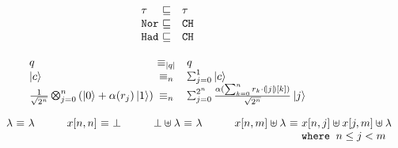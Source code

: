 \begin{figure}
{\footnotesize
{\hspace*{-6em}
\begin{minipage}[t]{0.35\textwidth}
\begin{center}
 \[
  \begin{array}{l@{~}cl}
  \tau & \sqsubseteq & \tau \\
  \tnort &\sqsubseteq& \tcht\\
  \thadt &\sqsubseteq& \tcht
    \end{array}
  \]
\end{center}
  \label{fig:qafny-subtype}
\end{minipage}
\qquad
\begin{minipage}[t]{0.5\textwidth}
\begin{center}
   \[
   \begin{array}{l@{~}cl}
   q & \equiv_{\slen{q}} & q \\
  \ket{c} &\equiv_n& \sch{1}{ }{c}\\
  \shad{2^n}{n}{\alpha(r_j)} &\equiv_n& \sch{2^n}{\frac{\alpha(\sum_{k=0}^{n} r_k \cdot \tos{j}[k])}{\sqrt{2^n}}}{j}
    \end{array}
 \]
\end{center}
  \label{fig:qafny-sequiv}
\end{minipage}
\hfill{}
\begin{minipage}[t]{0.8\textwidth}
\begin{center}
 \[
  \begin{array}{l @{~} c @{~} l l@{~}c @{~} l l @{~}c @{~} l l @ {~} c @{~} l}
\lambda &\equiv & \lambda
&
\qquad
x[n,n] & \equiv & \bot
&
\qquad
\bot \uplus \lambda & \equiv & \lambda
&
\qquad
x[n,m]\uplus\lambda & \equiv & x[n,j]\uplus x[j,m] \uplus\lambda
\\
&&&&&&&&&&&
\texttt{where}\;\;n \le j < m


\end{array}\]
\end{center}
\end{minipage}}}
\end{figure}
